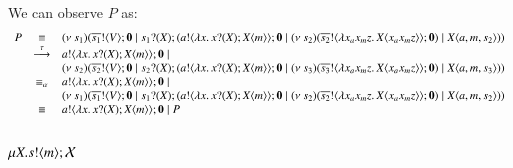 \noi We can observe $P$ as:
\[
	\begin{array}{rcl}
		P &\equiv&
		(\nu\ s_1)(\overline{s_1} ! \langle V \rangle ; \mathbf{0} \;|\; s_1 ? (X) ; (a ! \langle \lambda x.\,x ? (X) ; X\langle m \rangle \rangle ; \mathbf{0} \;|\;  (\nu\ s_2)(\overline{s_2} ! \langle \lambda x_a x_m z.\,X\langle x_a x_m z \rangle \rangle ; \mathbf{0}) \;|\; X\langle a,m, s_2 \rangle))
		\\
		&\stackrel{\tau}{\longrightarrow}&
		a ! \langle \lambda x.\,x ? (X) ; X\langle m \rangle \rangle ; \mathbf{0} \;|\; \\
		&& (\nu\ s_2)(\overline{s_2} ! \langle V \rangle ; \mathbf{0} \;|\; s_2 ? (X) ; (a ! \langle \lambda x.\,x ? (X) ; X\langle m \rangle \rangle ; \mathbf{0} \;|\; (\nu\ s_3)(\overline{s_3} ! \langle \lambda x_a x_m z.\,X\langle x_a x_m z \rangle \rangle ; \mathbf{0}) \;|\; X\langle a,m, s_3 \rangle))\\
		&\equiv_\alpha&
		a ! \langle \lambda x.\,x ? (X) ; X\langle m \rangle \rangle ; \mathbf{0} \;|\; \\
		&& (\nu\ s_1)(\overline{s_1} ! \langle V \rangle ; \mathbf{0} \;|\; s_1 ? (X) ; (a ! \langle \lambda x.\,x ? (X) ; X\langle m \rangle \rangle ; \mathbf{0} \;|\; (\nu\ s_2)(\overline{s_2} ! \langle \lambda x_a x_m z.\,X\langle x_a x_m z \rangle \rangle ; \mathbf{0}) \;|\; X\langle a,m, s_2 \rangle))
		\\

		&\equiv& a ! \langle \lambda x.\,x ? (X) ; X\langle m \rangle \rangle ; \mathbf{0} \;|\; P
	\end{array}
\]


\subsection{$\mu X. s ! \langle m \rangle ; \mathcal{X}$}

